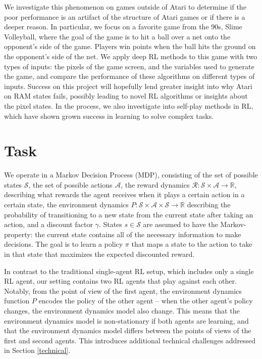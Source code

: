 \documentclass[10pt,twocolumn,letterpaper]{article}
\begin{document}
We investigate this phenomenon on games outside of Atari to determine
if the poor performance is an artifact of the structure of Atari games or if
there is a deeper reason. In particular, we focus on a favorite game from the
90s, Slime Volleyball, where the goal of the game is to hit a ball over a net
onto the opponent's side of the game. Players win points when the ball hits the
ground on the opponent's side of the net. We apply deep RL methods to
this game with two types of inputs: the pixels of the game screen, and the
variables used to generate the game, and compare the performance of these
algorithms on different types of inputs. Success on this project will hopefully
lend greater insight into why Atari on RAM states fails, possibly leading to
novel RL algorithms or insights about the pixel states. In the process, we
also investigate into self-play methods in RL, \citep{silver2016mastering} which
have shown grown success in learning to solve complex tasks.

\section{Task}

We operate in a Markov Decision Process (MDP), consisting of the set of
possible states $\mathcal{S}$, the set of possible actions $\mathcal{A}$, the
reward dynamics $\mathcal{R}: \mathcal{S} \times \mathcal{A} \to \mathbb{R}$,
describing what rewards the agent receives when it plays a certain action in a
certain state, the environment dynamics $P: \mathcal{S} \times \mathcal{A}
\times \mathcal{S} \to \mathbb{R}$ describing the probability of transitioning
to a new state from the current state after taking an action, and a discount
factor $\gamma$. States $s \in \mathcal{S}$ are assumed to have the
Markov-property: the current state contains all of the necessary information to make
decisions. The goal is to learn a policy $\pi$ that maps a state to the action
to take in that state that maximizes the expected discounted reward.

In contrast to the traditional single-agent RL setup, which includes only a
single RL agent, our setting contains two RL agents that play against each
other. Notably, from the point of view of the first agent, the environment
dynamics function $P$ encodes the policy of the other agent -- when the other
agent's policy changes, the environment dynamics model also change. This means
that the environment dynamics model is non-stationary if both agents are
learning, and that the environment dynamics model differs between the points
of views of the first and second agents. This introduces additional technical
challenges addressed in Section \ref{technical}.
\end{document}
